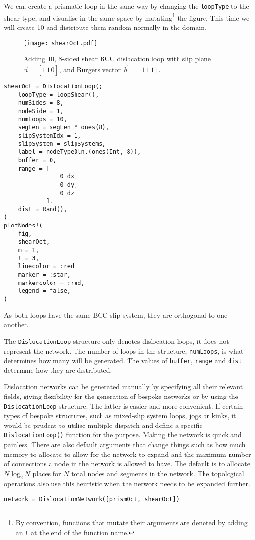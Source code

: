 We can create a prismatic loop in the same way by changing the \texttt{loopType} to the shear type, and visualise in the same space by mutating\footnote{By convention, functions that mutate their arguments are denoted by adding an \texttt{!} at the end of the function name.} the figure. This time we will create 10 and distribute them random normally in the domain.
\begin{figure}
    \centering
    \texttt{[image: shearOct.pdf]}
    \caption[Sample 8-sided shear prismatic BCC dislocation loop.]{Adding 10, 8-sided shear BCC dislocation loop with slip plane $ \vec{n} = [\overline{1}\, 1\, 0] $, and Burgers vector $\vec{b} = [1\, 1\, 1]$.}
\end{figure}
\begin{verbatim}
shearOct = DislocationLoop(;
    loopType = loopShear(),
    numSides = 8,
    nodeSide = 1,
    numLoops = 10,
    segLen = segLen * ones(8),
    slipSystemIdx = 1,
    slipSystem = slipSystems,
    label = nodeTypeDln.(ones(Int, 8)),
    buffer = 0,
    range = [
                0 dx; 
                0 dy;
                0 dz
            ],
    dist = Rand(),
)
plotNodes!(
    fig,
    shearOct,
    m = 1,
    l = 3,
    linecolor = :red,
    marker = :star,
    markercolor = :red,
    legend = false,
)
\end{verbatim}
As both loops have the same BCC slip system, they are orthogonal to one another.

The \texttt{DislocationLoop} structure only denotes dislocation loops, it does not represent the network. The number of loops in the structure, \texttt{numLoops}, is what determines how many will be generated. The values of \texttt{buffer}, \texttt{range} and \texttt{dist} determine how they are distributed.

Dislocation networks can be generated manually by specifying all their relevant fields, giving flexibility for the generation of bespoke networks or by using the \texttt{DislocationLoop} structure. The latter is easier and more convenient. If certain types of bespoke structures, such as mixed-slip system loops, jogs or kinks, it would be prudent to utilise multiple dispatch and define a specific \texttt{DislocationLoop()} function for the purpose. Making the network is quick and painless. There are also default arguments that change things such as how much memory to allocate to allow for the network to expand and the maximum number of connections a node in the network is allowed to have. The default is to allocate $N\log_2N$ places for $N$ total nodes and segments in the network. The topological operations also use this heuristic when the network needs to be expanded further.
\begin{verbatim}
network = DislocationNetwork([prismOct, shearOct])
\end{verbatim}

